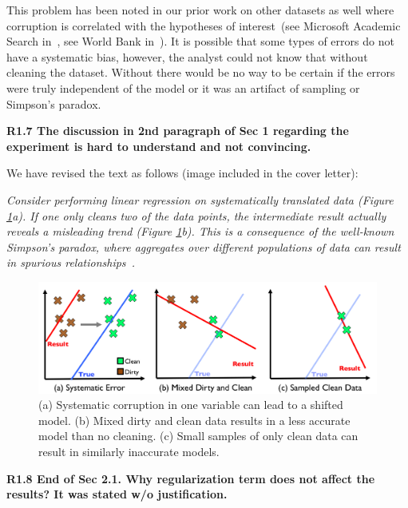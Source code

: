 This problem has been noted in our prior work on other datasets as well where corruption is correlated with the hypotheses of interest~(see Microsoft Academic Search in~\cite{wang1999sample}, see World Bank in~\cite{activecleanarxiv}). It is possible that some types of errors do not have a systematic bias, however, the analyst could not know that without cleaning the dataset.
Without \sys there would be no way to be certain if the errors were truly independent of the model or it was an artifact of sampling or Simpson's paradox.

\vspace{0.5em}

\noindent\textbf{R1.7 The discussion in 2nd paragraph of Sec 1 regarding the experiment is hard to understand and not convincing.}

\noindent We have revised the text as follows (image included in the cover letter):

\emph{Consider performing linear regression on systematically translated data (Figure \ref{update-arch-coverletter}a).
If one only cleans two of the data points, the intermediate result actually reveals a misleading trend (Figure \ref{update-arch-coverletter}b).
This is a consequence of the well-known Simpson's paradox, where aggregates over different populations of data can result in spurious relationships~\cite{simpson1951interpretation}.}

\begin{figure}[ht!]
\centering
 \includegraphics[width=\columnwidth]{figs/update-arch.png}
 \caption{(a) Systematic corruption in one variable can lead to a shifted model. 
 (b) Mixed dirty and clean data results in a less accurate model than no cleaning.
(c) Small samples of only clean data can result in similarly inaccurate models. \label{update-arch-coverletter}}
\end{figure}

\vspace{0.5em}

\noindent\textbf{R1.8 End of Sec 2.1. Why regularization term does not affect the results? It was stated w/o justification.}

